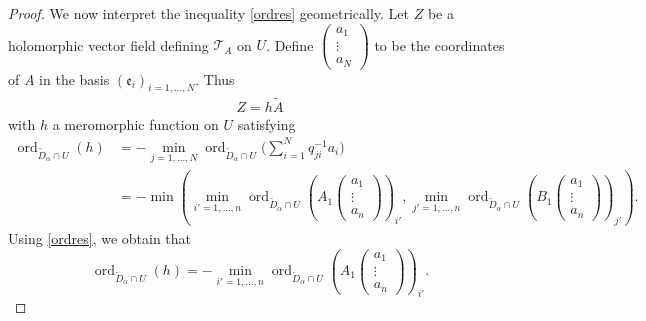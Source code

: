 \documentclass[pdftex]{sigma}
\numberwithin{equation}{section}
\begin{document}
\begin{proof}
We now interpret the inequality \eqref{ordres} geometrically. Let $Z$ be a holomorphic vector field defining $\mathcal{T}_A$ on $U$. Define $\left(\begin{smallmatrix}a_1\\ \vdots \\a_N\end{smallmatrix}\right)$ to be the coordinates of $A$ in the basis $(\mathfrak{e}_i)_{i=1,\dots,N}$. Thus
 \begin{gather*}%
 Z= h \tilde{A} \end{gather*}
 with $h$ a meromorphic function on $U$ satisfying
 \begin{align*} \operatorname{ord}_{\tilde{D}_\alpha \cap U} (h)&{}= - \min_{j=1,\dots,N} \operatorname{ord}_{\tilde{D}_\alpha \cap U}\Bigg(\sum_{i=1}^{N} q^{-1}_{ji} a_i\Bigg)\\
 &= -\min\left(\min_{i'=1,\dots,n} \operatorname{ord}_{\tilde{D}_\alpha \cap U}\left(\!A_1 \begin{pmatrix} a_1 \\ \vdots \\ a_n \end{pmatrix}\right)_{i'}, \min_{j'=1,\dots,n} \operatorname{ord}_{\tilde{D}_\alpha \cap U} \left(\!B_1 \begin{pmatrix} a_1 \\ \vdots \\ a_n \end{pmatrix}\right)_{j'}\right).
 \end{align*}
Using \eqref{ordres}, we obtain that
\[\operatorname{ord}_{\tilde{D}_\alpha\cap U}(h) = - \min_{i'=1,\dots,n} \operatorname{ord}_{\tilde{D}_\alpha \cap U}\left(A_1 \left(\begin{matrix} a_1 \\ \vdots \\ a_n \end{matrix}\right)\right)_{i'}.\]


\end{proof}
\end{document}
